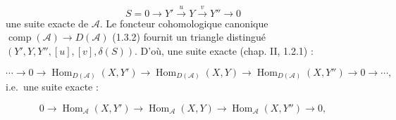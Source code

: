 \[
S=0\longrightarrow Y'\xrightarrow{u}Y\xrightarrow{v}Y''
\longrightarrow0
\]
une suite exacte de $\mathcal A$. Le foncteur cohomologique canonique
$\operatorname{comp}(\mathcal A)\longrightarrow D(\mathcal A)$ (1.3.2)
fournit un triangle distingué
$(Y',Y,Y'',[u],[v],\delta(S))$. D'où, une suite exacte (chap. II, 1.2.1) :

\[
\cdots\longrightarrow0\longrightarrow
\operatorname{Hom}_{D(\mathcal A)}(X,Y')\longrightarrow
\operatorname{Hom}_{D(\mathcal A)}(X,Y)\longrightarrow
\operatorname{Hom}_{D(\mathcal A)}(X,Y'')\longrightarrow0
\longrightarrow\cdots,
\]
i.e.\ une suite exacte :

\[
0\longrightarrow\operatorname{Hom}_{\mathcal A}(X,Y')
\longrightarrow\operatorname{Hom}_{\mathcal A}(X,Y)
\longrightarrow\operatorname{Hom}_{\mathcal A}(X,Y'')
\longrightarrow0,
\]
\endgroup
